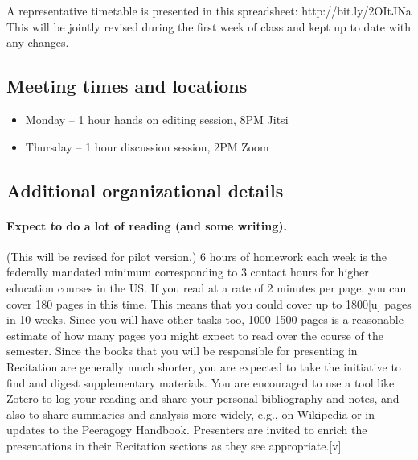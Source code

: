 A representative timetable is presented in this spreadsheet:
http://bit.ly/2OItJNa This will be jointly revised during the first week
of class and kept up to date with any changes.

\hypertarget{meeting-times-and-locations}{%
\subsection{Meeting times and
locations}\label{meeting-times-and-locations}}

\begin{itemize}
\tightlist
\item
  Monday -- 1 hour hands on editing session, 8PM Jitsi
\item
  Thursday -- 1 hour discussion session, 2PM Zoom
\end{itemize}

\hypertarget{additional-organizational-details}{%
\subsection{Additional organizational
details}\label{additional-organizational-details}}

\hypertarget{expect-to-do-a-lot-of-reading-and-some-writing.}{%
\paragraph{Expect to do a lot of reading (and some
writing).}\label{expect-to-do-a-lot-of-reading-and-some-writing.}}

(This will be revised for pilot version.) 6 hours of homework each week
is the federally mandated minimum corresponding to 3 contact hours for
higher education courses in the US. If you read at a rate of 2 minutes
per page, you can cover 180 pages in this time. This means that you
could cover up to 1800{[}u{]} pages in 10 weeks. Since you will have
other tasks too, 1000-1500 pages is a reasonable estimate of how many
pages you might expect to read over the course of the semester. Since
the books that you will be responsible for presenting in Recitation are
generally much shorter, you are expected to take the initiative to find
and digest supplementary materials. You are encouraged to use a tool
like Zotero to log your reading and share your personal bibliography and
notes, and also to share summaries and analysis more widely, e.g., on
Wikipedia or in updates to the Peeragogy Handbook. Presenters are
invited to enrich the presentations in their Recitation sections as they
see appropriate.{[}v{]}

